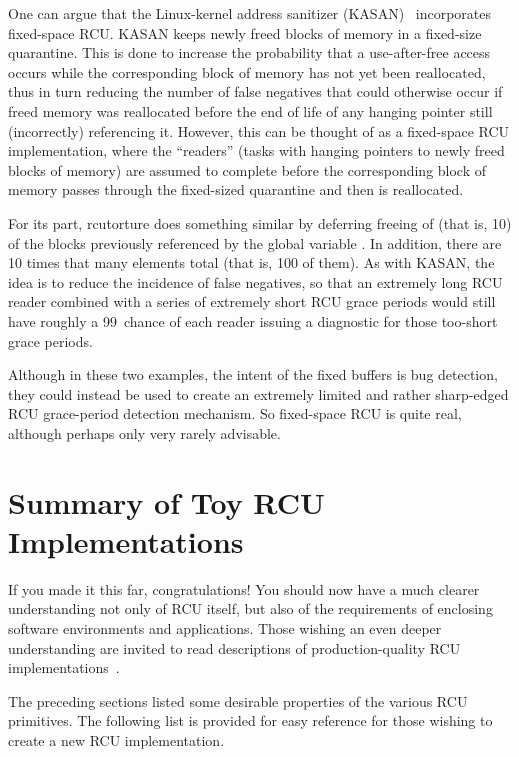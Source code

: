 One can argue that the Linux-kernel address sanitizer
(KASAN)~\cite{AndreyRyabinin2015KASAN} incorporates fixed-space RCU\@.
KASAN keeps newly freed blocks of memory in a fixed-size quarantine.
This is done to increase the probability that a use-after-free access
occurs while the corresponding  block of memory has not yet been
reallocated, thus in turn reducing the number of false negatives that
could otherwise occur if freed memory was reallocated before the end of
life of any hanging pointer still (incorrectly) referencing it.
However, this can be thought of as a fixed-space RCU implementation,
where the ``readers'' (tasks with hanging pointers to newly freed blocks
of memory) are assumed to complete before the corresponding block of
memory passes through the fixed-sized quarantine and then is reallocated.

For its part, rcutorture does something similar by deferring freeing
of  (that is, 10) of the blocks previously
referenced by the global variable .
In addition, there are 10 times that many elements total (that is,
100 of them).
As with KASAN, the idea is to reduce the incidence of false negatives,
so that an extremely long RCU reader combined with a series of extremely
short RCU grace periods would still have roughly a 99\pct\ chance of each
reader issuing a diagnostic for those too-short grace periods.

Although in these two examples, the intent of the fixed buffers is bug
detection, they could instead be used to create an extremely limited
and rather sharp-edged RCU grace-period detection mechanism.
So fixed-space RCU is quite real, although perhaps only very rarely
advisable.

\section{Summary of Toy RCU Implementations}
\label{sec:app:toyrcu:Summary of Toy RCU Implementations}

If you made it this far, congratulations!
You should now have a much clearer understanding
not only of RCU itself, but also of the requirements of enclosing
software environments and applications.
Those wishing an even deeper understanding are invited to read
descriptions of production-quality RCU
implementations~\cite{MathieuDesnoyers2012URCU,PaulEMcKenney2007PreemptibleRCU,PaulEMcKenney2008HierarchicalRCU,PaulEMcKenney2009BloatwatchRCU}.

The preceding sections listed some desirable properties of the
various RCU primitives.
The following list is provided for easy reference for those wishing to
create a new RCU implementation.

